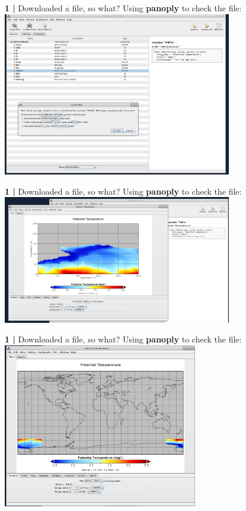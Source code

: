 \begin{frame}{\textbf{1 |} Downloaded a file, so what?}
    Using \textbf{panoply} to check the file:
    \centering\includegraphics[width=10cm]{images/Panoply1.png} \\
\end{frame}


\begin{frame}{\textbf{1 |} Downloaded a file, so what?}
    Using \textbf{panoply} to check the file:
    \centering\includegraphics[width=10cm]{images/Panoply2.png} \\
\end{frame}


\begin{frame}{\textbf{1 |} Downloaded a file, so what?}
    Using \textbf{panoply} to check the file:
    \centering\includegraphics[width=8.5cm]{images/Panoply3.png} \\
\end{frame}


